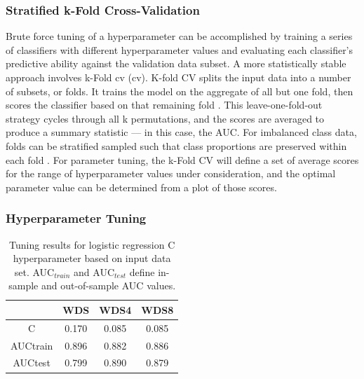 \subsubsection{Stratified k-Fold Cross-Validation} \label{ch5:strat_kfold_cv}

Brute force tuning of a hyperparameter can be accomplished by training a series of classifiers with different hyperparameter values and evaluating each classifier's predictive ability against the validation data subset. A more statistically stable approach involves k-Fold \acrlong{cv} (\acrshort{cv}). K-fold CV splits the input data into a number of subsets, or folds. It trains the model on the aggregate of all but one fold, then scores the classifier based on that remaining fold \citep[~p. 181]{james_introduction_2013}. This leave-one-fold-out strategy cycles through all k permutations, and the scores are averaged to produce a summary statistic --- in this case, the AUC. For imbalanced class data, folds can be stratified sampled such that class proportions are preserved within each fold \citep{brownlee_how_2020}. For parameter tuning, the k-Fold CV will define a set of average scores for the range of hyperparameter values under consideration, and the optimal parameter value can be determined from a plot of those scores.

\subsubsection{Hyperparameter Tuning} \label{ch5:hyper_tuning}
\begin{table}
\centering
\begin{tabular}{c|c|c|c|}
\cline{2-4}
                                 & WDS   & WDS4  & WDS8  \\ \hline
\multicolumn{1}{|c|}{C}          & 0.170 & 0.085 & 0.085 \\ \hline
\multicolumn{1}{|c|}{AUCtrain} & 0.896 & 0.882 & 0.886 \\ \hline
\multicolumn{1}{|c|}{AUCtest}  & 0.799 & 0.890 & 0.879 \\ \hline
\end{tabular}
\singlespacing
\caption[Logistic regression tuning results]{Tuning results for logistic regression C hyperparameter based on input data set. AUC$_{train}$ and AUC$_{test}$ define in-sample and out-of-sample AUC values.}
\label{tab:logreg_tuning}
\end{table}

